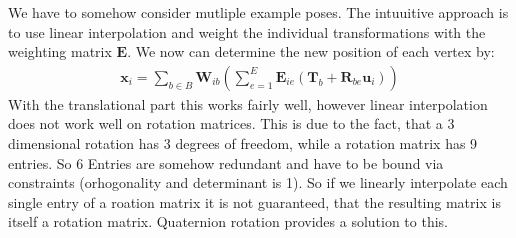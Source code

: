 We have to somehow consider mutliple example poses. The intuuitive approach is to use linear interpolation and weight the individual transformations with the weighting matrix $\bm{E}$. We now can determine the new position of each vertex by:
\begin{align}
\bm{x}_i = \sum_{b\in B}\bm{W}_{ib}\left( \sum_{e=1}^{E} \bm{E}_{ie} \left( \bm{T}_b + \bm{R}_{be} \bm{u}_i \right) \right) 
\end{align}
With the translational part this works fairly well, however linear interpolation does not work well on rotation matrices. This is due to the fact, that a 3 dimensional rotation has 3 degrees of freedom, while a rotation matrix has 9 entries. So 6 Entries are somehow redundant and have to be bound via constraints (orhogonality and determinant is 1). So if we linearly interpolate each single entry of a roation matrix it is not guaranteed, that the resulting matrix is itself a rotation matrix. Quaternion rotation provides a solution to this.
